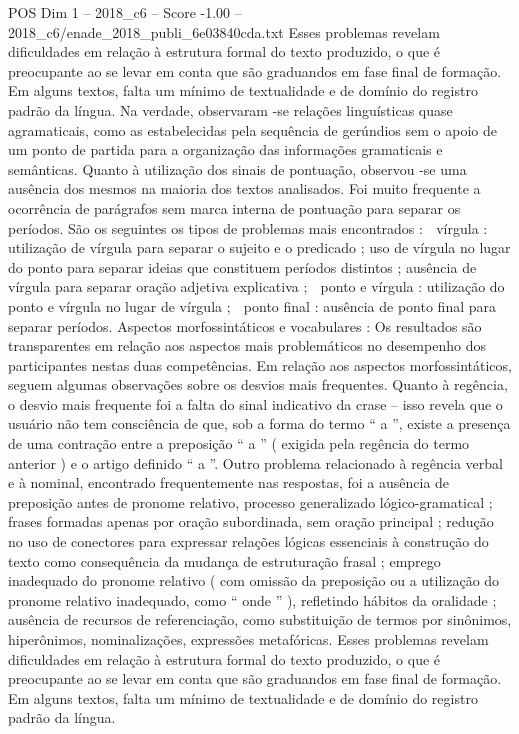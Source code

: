 \begin{textsample}{POS Dim 1 – 2018\_c6 – Score -1.00 – 2018\_c6/enade\_2018\_publi\_6e03840cda.txt}
Esses problemas revelam dificuldades em relação à estrutura formal do texto produzido, o que é preocupante ao se levar em conta que são graduandos em fase final de formação.
Em alguns textos, falta um mínimo de textualidade e de domínio do registro padrão da língua.
Na verdade, observaram -se relações linguísticas quase agramaticais, como as estabelecidas pela sequência de gerúndios sem o apoio de um ponto de partida para a organização das informações gramaticais e semânticas.
Quanto à utilização dos sinais de pontuação, observou -se uma ausência dos mesmos na maioria dos textos analisados.
Foi muito frequente a ocorrência de parágrafos sem marca interna de pontuação para separar os períodos.
São os seguintes os tipos de problemas mais encontrados :  vírgula : utilização de vírgula para separar o sujeito e o predicado ; uso de vírgula no lugar do ponto para separar ideias que constituem períodos distintos ; ausência de vírgula para separar oração adjetiva explicativa ;  ponto e vírgula : utilização do ponto e vírgula no lugar de vírgula ;  ponto final : ausência de ponto final para separar períodos.
Aspectos morfossintáticos e vocabulares : Os resultados são transparentes em relação aos aspectos mais problemáticos no desempenho dos participantes nestas duas competências.
Em relação aos aspectos morfossintáticos, seguem algumas observações sobre os desvios mais frequentes.
Quanto à regência, o desvio mais frequente foi a falta do sinal indicativo da crase – isso revela que o usuário não tem consciência de que, sob a forma do termo “ a ”, existe a presença de uma contração entre a preposição “ a ” ( exigida pela regência do termo anterior ) e o artigo definido “ a ”.
Outro problema relacionado à regência verbal e à nominal, encontrado frequentemente nas respostas, foi a ausência de preposição antes de pronome relativo, processo generalizado lógico-gramatical ; frases formadas apenas por oração subordinada, sem oração principal ; redução no uso de conectores para expressar relações lógicas essenciais à construção do texto como consequência da mudança de estruturação frasal ; emprego inadequado do pronome relativo ( com omissão da preposição ou a utilização do pronome relativo inadequado, como “ onde ” ), refletindo hábitos da oralidade ; ausência de recursos de referenciação, como substituição de termos por sinônimos, hiperônimos, nominalizações, expressões metafóricas.
Esses problemas revelam dificuldades em relação à estrutura formal do texto produzido, o que é preocupante ao se levar em conta que são graduandos em fase final de formação.
Em alguns textos, falta um mínimo de textualidade e de domínio do registro padrão da língua.

\end{textsample}
